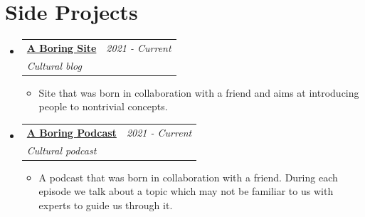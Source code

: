 \documentclass[a4paper,11pt]{article}
\makeatletter
\newcommand{\resumePOR}[3]{
\vspace{0.5mm}\item
    \begin{tabular*}{0.97\textwidth}[t]{l@{\extracolsep{\fill}}r}
        \textbf{#1},\hspace{0.3mm}#2 & \textit{\small{#3}} 
    \end{tabular*}
    \vspace{-2mm}
}
\newcommand{\resumeSubheading}[4]{
\vspace{0.5mm}\item
    \begin{tabular*}{0.98\textwidth}[t]{l@{\extracolsep{\fill}}r}
        \textbf{#1} & \textit{\footnotesize{#4}} \\
        \textit{\footnotesize{#3}} &  \footnotesize{#2}\\
    \end{tabular*}
    \vspace{-2.4mm}
}
\newcommand{\resumeProject}[4]{
\vspace{0.5mm}\item
    \begin{tabular*}{0.98\textwidth}[t]{l@{\extracolsep{\fill}}r}
        \textbf{#1} & \textit{\footnotesize{#3}} \\
        \footnotesize{\textit{#2}} & \footnotesize{#4}
    \end{tabular*}
    \vspace{-2.4mm}
}
\newcommand{\resumeSubHeadingListStart}{\begin{itemize}[leftmargin=*,labelsep=0mm]}
\newcommand{\resumeItemListStart}{\begin{justify}\begin{itemize}[leftmargin=3ex, rightmargin=2ex, 
  noitemsep,labelsep=1.2mm,itemsep=0mm]\small}
\newcommand{\resumeSubHeadingListEnd}{\end{itemize}\vspace{2mm}}
\newcommand{\resumeItemListEnd}{\end{itemize}\end{justify}\vspace{-2mm}}
\makeatother
\begin{document}




\section{\textbf{Side Projects}}
\vspace{-0.1mm}
\resumeSubHeadingListStart
\resumeProject
  {\href{https://www.aboringsite.com/}{\textbf{A Boring Site}}} %
  {Cultural blog} %
  {2021 - Current} %
  {
  } %
  \resumeItemListStart
  \item {Site that was born in collaboration with a friend and aims at introducing people 
  to nontrivial concepts.}
  \resumeItemListEnd

\resumeProject
  {\href{https://open.spotify.com/show/5mKtG1VeiAUcUcDIqKHrYL?si=a00a07d9f7574171}
  {\textbf{A Boring Podcast}}} %
  {Cultural podcast} %
  {2021 - Current} %
  {
  } %
  \resumeItemListStart
  \item {A podcast that was born in collaboration with a friend. During each episode we 
  talk about a topic which may not be familiar to us with experts to guide us through it.}
  \resumeItemListEnd

\resumeSubHeadingListEnd
\vfill
\end{document}
